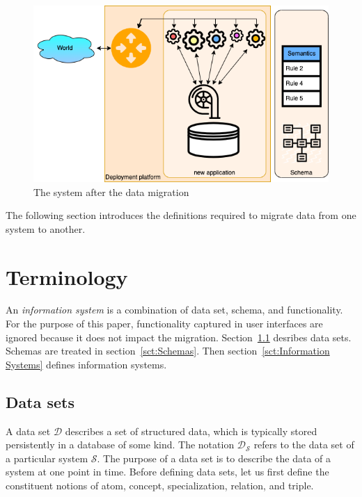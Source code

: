 \documentclass[runningheads]{llncs}
\newcommand{\dataset}{\mathscr{D}}
\newcommand{\infsys}{\mathscr{S}}
\begin{document}
\begin{figure}[bht]
   \begin{center}
     \includegraphics[scale=.35]{figures/datamigration-Post-migration.png}
   \end{center}
\caption{The system after the data migration}
\label{fig:post-migration}
\end{figure}

   The following section introduces the definitions required to migrate data from one system to another.

\section{Terminology}
\label{sct:Terminology}
   An {\em information system} is a combination of data set, schema, and functionality.
   For the purpose of this paper, functionality captured in user interfaces are ignored because it does not impact the migration.
   Section~\ref{sct:Data sets} desribes data sets. Schemas are treated in section~\ref{sct:Schemas}.
   Then section~\ref{sct:Information Systems} defines information systems.

\subsection{Data sets}
\label{sct:Data sets}
   A data set $\dataset$ describes a set of structured data, which is typically stored persistently in a database of some kind.
   The notation $\dataset_{\infsys}$ refers to the data set of a particular system $\infsys$.
   The purpose of a data set is to describe the data of a system at one point in time. 
   Before defining data sets, let us first define the constituent notions of atom, concept, specialization, relation, and triple.
   
\end{document}
